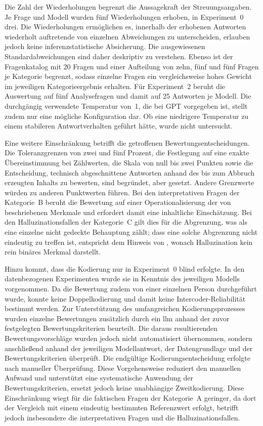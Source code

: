 Die Zahl der Wiederholungen begrenzt die Aussagekraft der Streuungsangaben. Je Frage und Modell wurden fünf Wiederholungen erhoben, in Experiment~0 drei. Die Wiederholungen ermöglichen es, innerhalb der erhobenen Antworten wiederholt auftretende von einzelnen Abweichungen zu unterscheiden, erlauben jedoch keine inferenzstatistische Absicherung. Die ausgewiesenen Standardabweichungen sind daher deskriptiv zu verstehen. Ebenso ist der Fragenkatalog mit 20 Fragen und einer Aufteilung von zehn, fünf und fünf Fragen je Kategorie begrenzt, sodass einzelne Fragen ein vergleichsweise hohes Gewicht im jeweiligen Kategorieergebnis erhalten. Für Experiment~2 beruht die Auswertung auf fünf Analysefragen und damit auf 25 Antworten je Modell. Die durchgängig verwendete Temperatur von~1, die bei GPT vorgegeben ist, stellt zudem nur eine mögliche Konfiguration dar. Ob eine niedrigere Temperatur zu einem stabileren Antwortverhalten geführt hätte, wurde nicht untersucht.

Eine weitere Einschränkung betrifft die getroffenen Bewertungsentscheidungen. Die Toleranzgrenzen von zwei und fünf Prozent, die Festlegung auf eine exakte Übereinstimmung bei Zählwerten, die Skala von null bis zwei Punkten sowie die Entscheidung, technisch abgeschnittene Antworten anhand des bis zum Abbruch erzeugten Inhalts zu bewerten, sind begründet, aber gesetzt. Andere Grenzwerte würden zu anderen Punktwerten führen.  Bei den interpretativen Fragen der Kategorie~B beruht die Bewertung auf einer Operationalisierung der von \textcite{koesten_talking_2021} beschriebenen Merkmale und erfordert damit eine inhaltliche Einschätzung. Bei den Halluzinationsfallen der Kategorie~C gilt dies für die Abgrenzung, was als eine einzelne nicht gedeckte Behauptung zählt; dass eine solche Abgrenzung nicht eindeutig zu treffen ist, entspricht dem Hinweis von \textcite{agrawal_language_2024}, wonach Halluzination kein rein binäres Merkmal darstellt.

Hinzu kommt, dass die Kodierung nur in Experiment~0 blind erfolgte. In den datenbezogenen Experimenten wurde sie in Kenntnis des jeweiligen Modells vorgenommen. Da die Bewertung zudem von einer einzelnen Person durchgeführt wurde, konnte keine Doppelkodierung und damit keine Intercoder-Reliabilität bestimmt werden. Zur Unterstützung des umfangreichen Kodierungsprozesses wurden einzelne Bewertungen zusätzlich durch ein \gls{llm} anhand der zuvor festgelegten Bewertungskriterien beurteilt. Die daraus resultierenden Bewertungsvorschläge wurden jedoch nicht automatisiert übernommen, sondern anschließend anhand der jeweiligen Modellantwort, der Datengrundlage und der Bewertungskriterien überprüft. Die endgültige Kodierungsentscheidung erfolgte nach manueller Überprüfung. Diese Vorgehensweise reduziert den manuellen Aufwand und unterstützt eine systematische Anwendung der Bewertungskriterien, ersetzt jedoch keine unabhängige Zweitkodierung. Diese Einschränkung wiegt für die faktischen Fragen der Kategorie~A geringer, da dort der Vergleich mit einem eindeutig bestimmten Referenzwert erfolgt, betrifft jedoch insbesondere die interpretativen Fragen und die Halluzinationsfallen.

